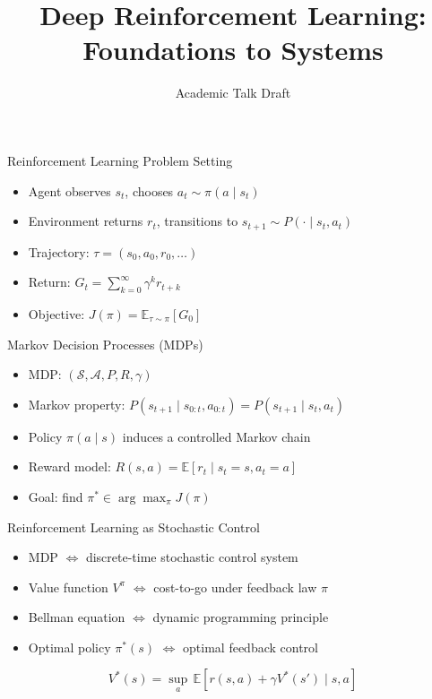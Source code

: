 \documentclass[aspectratio=169]{beamer}
\title{Deep Reinforcement Learning: Foundations to Systems}
\author{Academic Talk Draft}
\date{}
\begin{document}

\begin{frame}{Reinforcement Learning Problem Setting}
\begin{itemize}
  \item Agent observes $s_t$, chooses $a_t\sim\pi(a\mid s_t)$
  \item Environment returns $r_t$, transitions to $s_{t+1}\sim P(\cdot\mid s_t,a_t)$
  \item Trajectory: $\tau=(s_0,a_0,r_0,\dots)$
  \item Return: $G_t=\sum_{k=0}^{\infty}\gamma^k r_{t+k}$
  \item Objective: $J(\pi)=\mathbb{E}_{\tau\sim\pi}[G_0]$
\end{itemize}
\end{frame}

\begin{frame}{Markov Decision Processes (MDPs)}
\begin{itemize}
  \item MDP: $(\mathcal S,\mathcal A,P,R,\gamma)$
  \item Markov property: $P(s_{t+1}\mid s_{0:t},a_{0:t})=P(s_{t+1}\mid s_t,a_t)$
  \item Policy $\pi(a\mid s)$ induces a controlled Markov chain
  \item Reward model: $R(s,a)=\mathbb{E}[r_t\mid s_t=s,a_t=a]$
  \item Goal: find $\pi^*\in\arg\max_\pi J(\pi)$
\end{itemize}
\end{frame}

\begin{frame}{Reinforcement Learning as Stochastic Control}
\begin{itemize}
  \item MDP $\Leftrightarrow$ discrete-time stochastic control system
  \item Value function $V^\pi$ $\Leftrightarrow$ cost-to-go under feedback law $\pi$
  \item Bellman equation $\Leftrightarrow$ dynamic programming principle
  \item Optimal policy $\pi^*(s)$ $\Leftrightarrow$ optimal feedback control
\end{itemize}
\[
V^*(s)=\sup_a\,\mathbb{E}\!\left[r(s,a)+\gamma V^*(s')\mid s,a\right]
\]
\end{frame}
\end{document}
